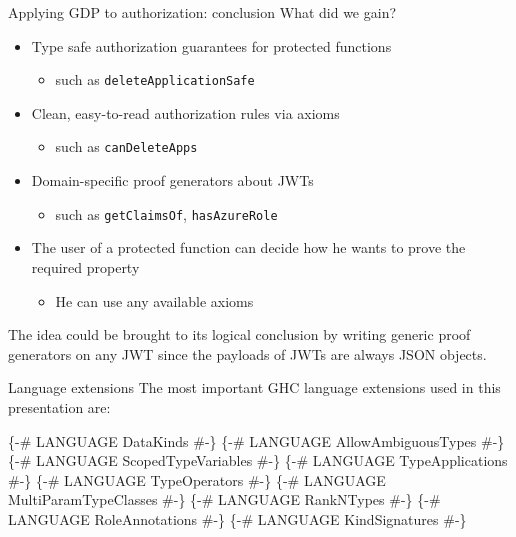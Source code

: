 \documentclass[
  9pt,
  ignorenonframetext,
]{beamer}
\newenvironment{Shaded}{}{}
\newcommand{\OtherTok}[1]{\textcolor[rgb]{0.00,0.44,0.13}{#1}}
\providecommand{\tightlist}{%
  \setlength{\itemsep}{0pt}\setlength{\parskip}{0pt}}
\begin{document}
\begin{frame}[fragile]{Applying GDP to authorization: conclusion}
\protect\hypertarget{applying-gdp-to-authorization-conclusion}{}
What did we gain?

\begin{itemize}
\tightlist
\item
  Type safe authorization guarantees for protected functions

  \begin{itemize}
  \tightlist
  \item
    such as \texttt{deleteApplicationSafe}
  \end{itemize}
\item
  Clean, easy-to-read authorization rules via axioms

  \begin{itemize}
  \tightlist
  \item
    such as \texttt{canDeleteApps}
  \end{itemize}
\item
  Domain-specific proof generators about JWTs

  \begin{itemize}
  \tightlist
  \item
    such as \texttt{getClaimsOf}, \texttt{hasAzureRole}
  \end{itemize}
\item
  The user of a protected function can decide how he wants to prove the
  required property

  \begin{itemize}
  \tightlist
  \item
    He can use any available axioms
  \end{itemize}
\end{itemize}

The idea could be brought to its logical conclusion by writing generic
proof generators on any JWT since the payloads of JWTs are always JSON
objects.







\end{frame}

\begin{frame}[fragile]{Language extensions}
\protect\hypertarget{language-extensions}{}
The most important GHC language extensions used in this presentation
are:

\begin{Shaded}
\begin{Highlighting}[]
\OtherTok{\{{-}\# LANGUAGE DataKinds             \#{-}\}}
\OtherTok{\{{-}\# LANGUAGE AllowAmbiguousTypes   \#{-}\}}
\OtherTok{\{{-}\# LANGUAGE ScopedTypeVariables   \#{-}\}}
\OtherTok{\{{-}\# LANGUAGE TypeApplications      \#{-}\}}
\OtherTok{\{{-}\# LANGUAGE TypeOperators         \#{-}\}}
\OtherTok{\{{-}\# LANGUAGE MultiParamTypeClasses \#{-}\}}
\OtherTok{\{{-}\# LANGUAGE RankNTypes            \#{-}\}}
\OtherTok{\{{-}\# LANGUAGE RoleAnnotations       \#{-}\}}
\OtherTok{\{{-}\# LANGUAGE KindSignatures        \#{-}\}}
\end{Highlighting}
\end{Shaded}
\end{frame}
\end{document}
